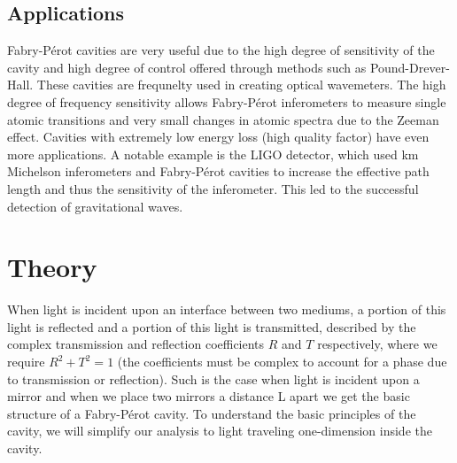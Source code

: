 \documentclass[twocolumn,amsmath,amssymb,pra]{revtex4-2}
\begin{document}
\subsection{Applications}
Fabry-P\'{e}rot cavities are very useful due to the high degree of sensitivity of the cavity and high degree of control offered through methods such as Pound-Drever-Hall. These cavities are frequnelty used in creating optical wavemeters. The high degree of frequency sensitivity allows Fabry-P\'{e}rot inferometers to measure single atomic transitions and very small changes in atomic spectra due to the Zeeman effect. Cavities with extremely low energy loss (high quality factor) have even more applications. A notable example is the LIGO detector, which used km Michelson inferometers and Fabry-P\'{e}rot cavities to increase the effective path length and thus the sensitivity of the inferometer. This led to the successful detection of gravitational waves.

\section{Theory}

When light is incident upon an interface between two mediums, a portion of this light is reflected and a portion of this light is transmitted, described by the complex transmission and reflection coefficients $R$ and $T$ respectively, where we require $R^2 + T^2 = 1$ (the coefficients must be complex to account for a phase due to transmission or reflection). Such is the case when light is incident upon a mirror and when we place two mirrors a distance L apart we get the basic structure of a Fabry-P\'{e}rot cavity. To understand the basic principles of the cavity, we will simplify our analysis to light traveling one-dimension inside the cavity.
\end{document}
